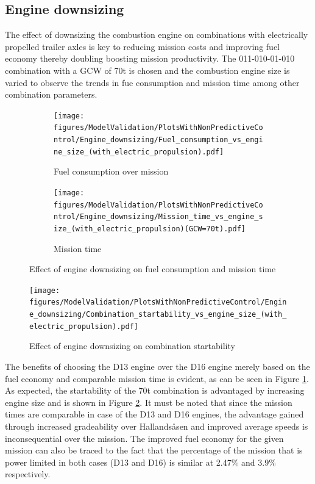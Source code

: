 \documentclass[ExampleMasters.tex]{subfiles}
\begin{document}
\subsection{Engine downsizing}
The effect of downsizing the combustion engine on combinations with electrically propelled trailer axles is key to reducing mission costs and improving fuel economy thereby doubling boosting mission productivity. The 011-010-01-010 combination with a GCW of 70t is chosen and the combustion engine size is varied to observe the trends in fue consumption and mission time among other combination parameters.\\
\begin{figure}[h!]
\begin{subfigure}{.5\textwidth}
\centering
\texttt{[image: figures/ModelValidation/PlotsWithNonPredictiveControl/Engine\_downsizing/Fuel\_consumption\_vs\_engine\_size\_(with\_electric\_propulsion).pdf]}
\caption{Fuel consumption over mission}
\end{subfigure}
\begin{subfigure}{.5\textwidth}
\centering
\texttt{[image: figures/ModelValidation/PlotsWithNonPredictiveControl/Engine\_downsizing/Mission\_time\_vs\_engine\_size\_(with\_electric\_propulsion)(GCW=70t).pdf]}
\caption{Mission time}
\end{subfigure}
\caption{Effect of engine downsizing on fuel consumption and mission time}
\label{fuelTimeEngineDownsize}
\end{figure}
\begin{figure}[h!]
\centering
\texttt{[image: figures/ModelValidation/PlotsWithNonPredictiveControl/Engine\_downsizing/Combination\_startability\_vs\_engine\_size\_(with\_electric\_propulsion).pdf]}
\caption{Effect of engine downsizing on combination startability}
\label{startabilityEngineDownsize}
\end{figure}
The benefits of choosing the D13 engine over the D16 engine merely based on the fuel economy and comparable mission time is evident, as can be seen in Figure \ref{fuelTimeEngineDownsize}. As expected, the startability of the 70t combination is advantaged by increasing engine size and is shown in Figure \ref{startabilityEngineDownsize}. It must be noted that since the mission times are comparable in case of the D13 and D16 engines, the advantage gained through increased gradeability over Hallands\aa sen and improved average speeds is inconsequential over the mission. The improved fuel economy for the given mission can also be traced to the fact that the percentage of the mission that is power limited in both cases (D13 and D16) is similar at 2.47\% and 3.9\% respectively.\\
\end{document}
